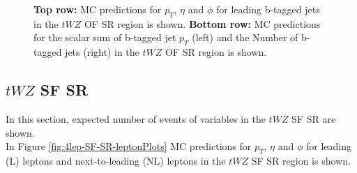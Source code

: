 \begin{figure}[htbp]
    \caption{\textbf{Top row:} MC predictions for $p_{T}$, $\eta$ and $\phi$ for leading b-tagged jets in the $tWZ$ OF SR region  is shown. \textbf{Bottom row:} MC predictions for the scalar sum of b-tagged jet $p_{T}$ (left) and the Number of b-tagged jets (right) in the $tWZ$ OF SR region  is shown.}
  \label{fig:4lep-OF-SR-bjetPlots}
\end{figure}


\subsection{$tWZ$ SF SR}
\label{sec:controlplotstetralepton-tWZ-SF-SR}


In this section, expected number of events of variables in the $tWZ$ SF SR are shown.\\

In Figure \ref{fig:4lep-SF-SR-leptonPlots} MC predictions for $p_{T}$, $\eta$ and $\phi$ for leading (L) leptons and next-to-leading (NL) leptons in the $tWZ$ SF SR region is shown.

